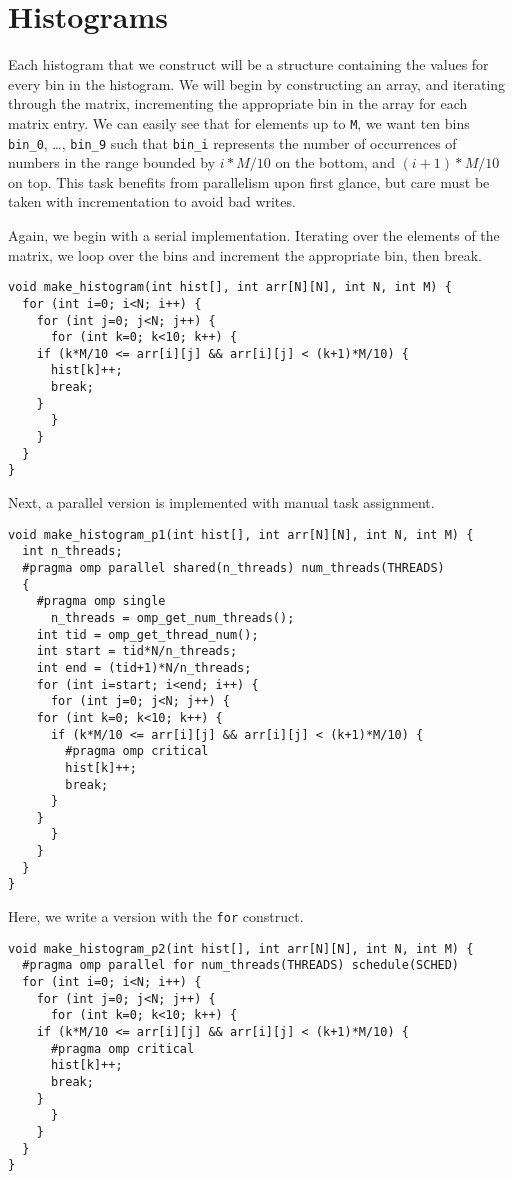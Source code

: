 \documentclass[11pt]{article}
\begin{document}
\section{Histograms}
\label{sec-3}

Each histogram that we construct will be a structure containing the
values for every bin in the histogram. We will begin by constructing
an array, and iterating through the matrix, incrementing the
appropriate bin in the array for each matrix entry. We can easily see
that for elements up to \verb~M~, we want ten bins \verb~bin_0~, \ldots{}, \verb~bin_9~
such that \verb~bin_i~ represents the number of occurrences of numbers in
the range bounded by $i*M/10$ on the bottom, and $(i+1)*M/10$ on
top. This task benefits from parallelism upon first glance, but care
must be taken with incrementation to avoid bad writes.

Again, we begin with a serial implementation. Iterating over the
elements of the matrix, we loop over the bins and increment the
appropriate bin, then break.

\begin{verbatim}
void make_histogram(int hist[], int arr[N][N], int N, int M) {
  for (int i=0; i<N; i++) {
    for (int j=0; j<N; j++) {
      for (int k=0; k<10; k++) {
	if (k*M/10 <= arr[i][j] && arr[i][j] < (k+1)*M/10) {
	  hist[k]++;
	  break;
	}
      }
    }
  }
}
\end{verbatim}

Next, a parallel version is implemented with manual task assignment.

\begin{verbatim}
void make_histogram_p1(int hist[], int arr[N][N], int N, int M) {
  int n_threads;
  #pragma omp parallel shared(n_threads) num_threads(THREADS)
  {
    #pragma omp single
      n_threads = omp_get_num_threads();
    int tid = omp_get_thread_num();
    int start = tid*N/n_threads;
    int end = (tid+1)*N/n_threads;
    for (int i=start; i<end; i++) {
      for (int j=0; j<N; j++) {
	for (int k=0; k<10; k++) {
	  if (k*M/10 <= arr[i][j] && arr[i][j] < (k+1)*M/10) {
	    #pragma omp critical
	    hist[k]++;
	    break;
	  }
	}
      }
    }
  }
}
\end{verbatim}

Here, we write a version with the \verb~for~ construct.

\begin{verbatim}
void make_histogram_p2(int hist[], int arr[N][N], int N, int M) {
  #pragma omp parallel for num_threads(THREADS) schedule(SCHED)
  for (int i=0; i<N; i++) {
    for (int j=0; j<N; j++) {
      for (int k=0; k<10; k++) {
	if (k*M/10 <= arr[i][j] && arr[i][j] < (k+1)*M/10) {
	  #pragma omp critical
	  hist[k]++;
	  break;
	}
      }
    }
  }
}
\end{verbatim}
\end{document}
